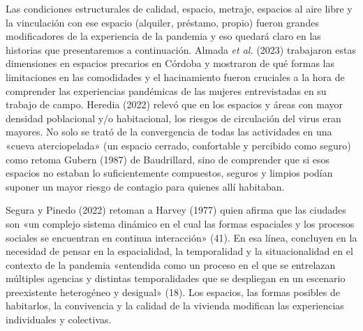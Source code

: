 Las condiciones estructurales de calidad, espacio, metraje, espacios al aire libre y la vinculación con ese espacio (alquiler, préstamo, propio) fueron grandes modificadores de la experiencia de la pandemia y eso quedará claro en las historias que presentaremos a continuación. Almada \emph{et al.} (2023) trabajaron estas dimensiones en espacios precarios en Córdoba y mostraron de qué formas las limitaciones en las comodidades y el hacinamiento fueron cruciales a la hora de comprender las experiencias pandémicas de las mujeres entrevistadas en su trabajo de campo. Heredia (2022) relevó que en los espacios y áreas con mayor densidad poblacional y/o habitacional, los riesgos de circulación del virus eran mayores. No solo se trató de la convergencia de todas las actividades en una «cueva aterciopelada» (un espacio cerrado, confortable y percibido como seguro) como retoma Gubern (1987) de Baudrillard, sino de comprender que si esos espacios no estaban lo suficientemente compuestos, seguros y limpios podían suponer un mayor riesgo de contagio para quienes allí habitaban.

Segura y Pinedo (2022) retoman a Harvey (1977) quien afirma que las ciudades son «un complejo sistema dinámico en el cual las formas espaciales y los procesos sociales se encuentran en continua interacción» (41). En esa línea, concluyen en la necesidad de pensar en la espacialidad, la temporalidad y la situacionalidad en el contexto de la pandemia «entendida como un proceso en el que se entrelazan múltiples agencias y distintas temporalidades que se despliegan en un escenario preexistente heterogéneo y desigual» (18). Los espacios, las formas posibles de habitarlos, la convivencia y la calidad de la vivienda modifican las experiencias individuales y colectivas.

